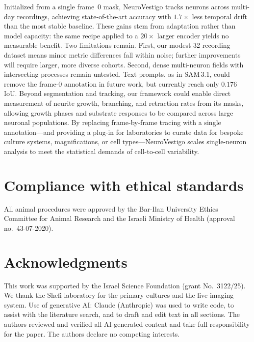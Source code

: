 \documentclass{article}
\begin{document}
Initialized from a single frame~0 mask, NeuroVestigo tracks neurons across multi-day recordings, achieving state-of-the-art accuracy with $1.7\times$ less temporal drift than the most stable baseline. These gains stem from adaptation rather than model capacity: the same recipe applied to a $20\times$ larger encoder yields no measurable benefit. Two limitations remain. First, our modest 32-recording dataset means minor metric differences fall within noise; further improvements will require larger, more diverse cohorts. Second, dense multi-neuron fields with intersecting processes remain untested. Text prompts, as in SAM\,3.1, could remove the frame-0 annotation in future work, but currently reach only $0.176$ IoU. Beyond segmentation and tracking, our framework could enable direct measurement of neurite growth, branching, and retraction rates from its masks, allowing growth phases and substrate responses to be compared across large neuronal populations. By replacing frame-by-frame tracing with a single annotation---and providing a plug-in for laboratories to curate data for bespoke culture systems, magnifications, or cell types---NeuroVestigo scales single-neuron analysis to meet the statistical demands of cell-to-cell variability.

\section{Compliance with ethical standards}
\label{sec:ethics}

All animal procedures were approved by the Bar-Ilan University Ethics
Committee for Animal Research and the Israeli Ministry of Health (approval
no.~43-07-2020).

\section{Acknowledgments}
\label{sec:ack}

This work was supported by the Israel Science Foundation (grant No.~3122/25).
We thank the Shefi laboratory for the primary cultures and the live-imaging
system.
Use of generative AI: Claude (Anthropic) was used to write code, to assist with the literature search,
and to draft and edit text in all sections.
The authors reviewed and verified all AI-generated content and take full
responsibility for the paper. The authors declare no competing interests.

{\small

}
\end{document}
